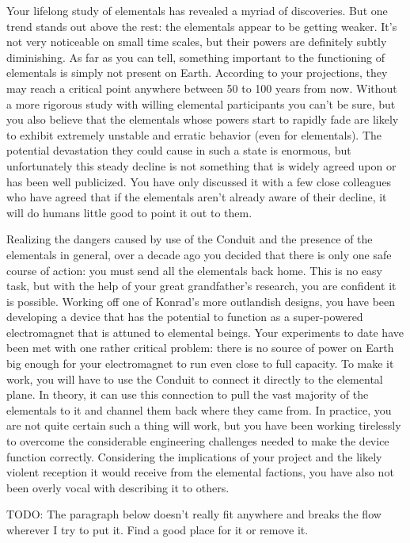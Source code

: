 \documentclass[char]{elementals}
\begin{document}
Your lifelong study of elementals has revealed a myriad of discoveries. But one trend stands out above the rest: the elementals appear to be getting weaker. It's not very noticeable on small time scales, but their powers are definitely subtly diminishing. As far as you can tell, something important to the functioning of elementals is simply not present on Earth. According to your projections, they may reach a critical point anywhere between 50 to 100 years from now. Without a more rigorous study with willing elemental participants you can't be sure, but you also believe that the elementals whose powers start to rapidly fade are likely to exhibit extremely unstable and erratic behavior (even for elementals). The potential devastation they could cause in such a state is enormous, but unfortunately this steady decline is not something that is widely agreed upon or has been well publicized. You have only discussed it with a few close colleagues who have agreed that if the elementals aren't already aware of their decline, it will do humans little good to point it out to them.

Realizing the dangers caused by use of the Conduit and the presence of the elementals in general, over a decade ago you decided that there is only one safe course of action: you must send all the elementals back home. This is no easy task, but with the help of your great grandfather's research, you are confident it is possible. Working off one of Konrad's more outlandish designs, you have been developing a device that has the potential to function as a super-powered electromagnet that is attuned to elemental beings. Your experiments to date have been met with one rather critical problem: there is no source of power on Earth big enough for your electromagnet to run even close to full capacity. To make it work, you will have to use the Conduit to connect it directly to the elemental plane. In theory, it can use this connection to pull the vast majority of the elementals to it and channel them back where they came from. In practice, you are not quite certain such a thing will work, but you have been working tirelessly to overcome the considerable engineering challenges needed to make the device function correctly. Considering the implications of your project and the likely violent reception it would receive from the elemental factions, you have also not been overly vocal with describing it to others.

TODO: The paragraph below doesn't really fit anywhere and breaks the flow wherever I try to put it. Find a good place for it or remove it.
\end{document}
